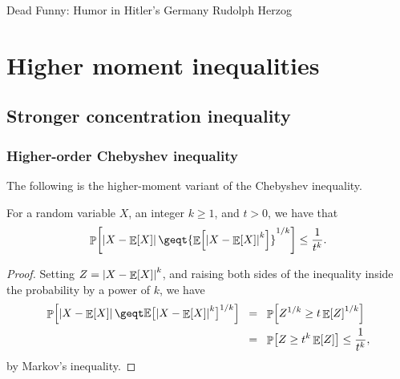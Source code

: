 %


\ChapterPrefix{}
\ChapterGen{}

%
{Dead Funny: Humor in Hitler's Germany}%
{Rudolph Herzog}



\section{Higher moment inequalities}

\subsection{Stronger concentration inequality}

\subsubsection{Higher-order Chebyshev inequality}
The following is the higher-moment variant of the Chebyshev inequality.
\begin{lemma}
    For a random variable $X$, an integer $k \geq 1$, and $t > 0$, we have that
    \begin{equation*}
        \ds%
        \Prob{\cardin{X - \Ex{X}}
           \geq%
           t {\Ex{ \bigl. {\cardin{X -  \Ex{X}}}^k} }^{1/k}}  
        \leq
        \frac{1}{t^k}.
    \end{equation*}
\end{lemma}
\begin{proof}
    Setting $Z = \left| {X - \mathop{\mathbb{E}}\!\left[ {X} \right]} \right|^k$, and 
    raising both sides of the inequality inside the probability by a power of $k$, we have
    \begin{align*}
        \Prob{\cardin{X - \Ex{X}}
           \geq%
           t \ExChar \bigl[ \cardin{X - \Ex{X}}^k \bigr]^{1/k} } %
        &
        \EQ %
      \Prob{Z^{1/k} \geq t \Ex{ Z }^{1/k}}
      \\&
      \EQ%
      \Prob{Z \geq t^k \Ex{Z}}%
      \leq%
      \frac{1}{t^k},
    \end{align*}
    by Markov's inequality.
\end{proof}


